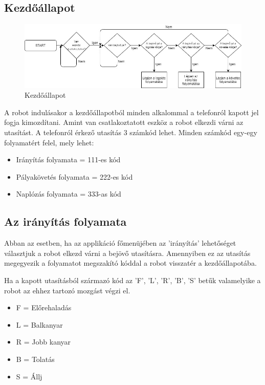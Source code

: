 \documentclass[]{thesis-ekf}
\theoremstyle{definition}
\begin{document}
\subsection{Kezdőállapot}\label{kezdokepernyo_allapot}
\begin{figure}[h]
	\centering
	\includegraphics[width=\columnwidth]{images/grafok/fomenu_graf}
	\caption{Kezdőállapot}
	\label{start_allapot}
\end{figure}
A robot indulásakor a kezdőállapotból minden alkalommal a telefonról kapott jel fogja kimozdítani. Amint van csatlakoztatott eszköz a robot elkezdi várni az utasítást. A telefonról érkező utasítás 3 számkód lehet. Minden számkód egy-egy folyamatért felel, mely lehet:
\begin{itemize}
	\item Irányítás folyamata = 111-es kód
	\item Pályakövetés folyamata = 222-es kód
	\item Naplózás folyamata = 333-as kód
\end{itemize}
\subsection{Az irányítás folyamata}\label{controlkepernyo_allapo}
Abban az esetben, ha az applikáció főmenüjében az ’irányítás’ lehetőséget választjuk a robot elkezd várni a bejövő utasításra. Amennyiben ez az utasítás megegyezik a folyamatot megszakító kóddal a robot visszatér a kezdőállapotába.

Ha a kapott utasításból származó kód az 'F', 'L', 'R', 'B', 'S' betűk valamelyike a robot az ehhez tartozó mozgást végzi el.
\begin{itemize}
	\item F = Előrehaladás
	\item L = Balkanyar
	\item R = Jobb kanyar
	\item B = Tolatás
	\item S = Állj
\end{itemize}
\end{document}

